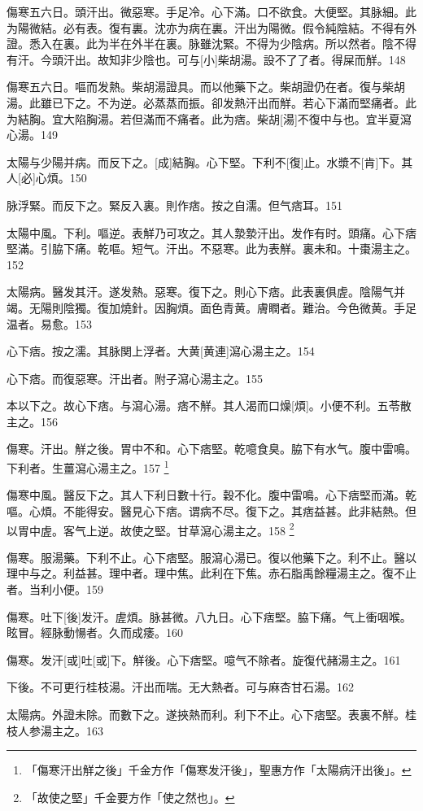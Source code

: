 \documentclass[12pt,twoside,UTF8,b5paper]{ctexbook}
\begin{document}
傷寒五六日。頭汗出。微惡寒。手足冷。心下滿。口不欲食。大便堅。其脉細。此为陽微結。必有表。復有裏。沈亦为病在裏。汗出为陽微。假令純陰結。不得有外證。悉入在裏。此为半在外半在裏。脉雖沈緊。不得为少陰病。所以然者。陰不得有汗。今頭汗出。故知非少陰也。可与[小]柴胡湯。設不了了者。得屎而觧。148

傷寒五六日。嘔而发熱。柴胡湯證具。而以他藥下之。柴胡證仍在者。復与柴胡湯。此雖已下之。不为逆。必蒸蒸而振。卻发熱汗出而觧。若心下滿而堅痛者。此为結胸。宜大陷胸湯。若但滿而不痛者。此为痞。柴胡[湯]不復中与也。宜半夏瀉心湯。149

太陽与少陽并病。而反下之。[成]結胸。心下堅。下利不[復]止。水漿不[肯]下。其人[必]心煩。150

脉浮緊。而反下之。緊反入裏。則作痞。按之自濡。但气痞耳。151

太陽中風。下利。嘔逆。表觧乃可攻之。其人漐漐汗出。发作有时。頭痛。心下痞堅滿。引脇下痛。乾嘔。短气。汗出。不惡寒。此为表觧。裏未和。十棗湯主之。152

太陽病。醫发其汗。遂发熱。惡寒。復下之。則心下痞。此表裏俱虗。陰陽气并竭。无陽則陰獨。復加燒針。因胸煩。面色青黄。膚瞤者。難治。今色微黄。手足温者。易愈。153

心下痞。按之濡。其脉関上浮者。大黄[黄連]瀉心湯主之。154

心下痞。而復惡寒。汗出者。附子瀉心湯主之。155

本以下之。故心下痞。与瀉心湯。痞不觧。其人渴而口燥[煩]。小便不利。五苓散主之。156

傷寒。汗出。觧之後。胃中不和。心下痞堅。乾噫食臭。脇下有水气。腹中雷鳴。下利者。生薑瀉心湯主之。157
	\footnote{「傷寒汗出觧之後」千金方作「傷寒发汗後」，聖惠方作「太陽病汗出後」。}

傷寒中風。醫反下之。其人下利日數十行。穀不化。腹中雷鳴。心下痞堅而滿。乾嘔。心煩。不能得安。醫見心下痞。谓病不尽。復下之。其痞益甚。此非結熱。但以胃中虗。客气上逆。故使之堅。甘草瀉心湯主之。158
	\footnote{「故使之堅」千金要方作「使之然也」。}

傷寒。服湯藥。下利不止。心下痞堅。服瀉心湯已。復以他藥下之。利不止。醫以理中与之。利益甚。理中者。理中焦。此利在下焦。赤石脂禹餘糧湯主之。復不止者。当利小便。159

傷寒。吐下[後]发汗。虗煩。脉甚微。八九日。心下痞堅。脇下痛。气上衝咽喉。眩冒。經脉動愓者。久而成痿。160

傷寒。发汗[或]吐[或]下。觧後。心下痞堅。噫气不除者。旋復代赭湯主之。161

下後。不可更行桂枝湯。汗出而喘。无大熱者。可与麻杏甘石湯。162

太陽病。外證未除。而數下之。遂挾熱而利。利下不止。心下痞堅。表裏不觧。桂枝人参湯主之。163
\end{document}
